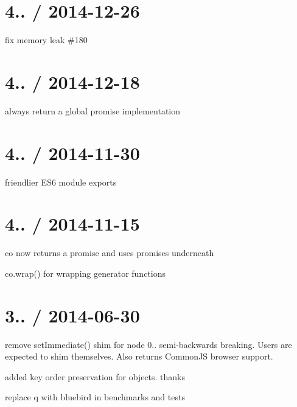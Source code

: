 \section*{4.. / 2014-\/12-\/26 }


\begin{DoxyItemize}
\item fix memory leak \#180
\end{DoxyItemize}

\section*{4.. / 2014-\/12-\/18 }


\begin{DoxyItemize}
\item always return a global promise implementation
\end{DoxyItemize}

\section*{4.. / 2014-\/11-\/30 }


\begin{DoxyItemize}
\item friendlier E\+S6 module exports
\end{DoxyItemize}

\section*{4.. / 2014-\/11-\/15 }


\begin{DoxyItemize}
\item co now returns a promise and uses promises underneath
\item {\ttfamily co.\+wrap()} for wrapping generator functions
\end{DoxyItemize}

\section*{3.. / 2014-\/06-\/30 }


\begin{DoxyItemize}
\item remove {\ttfamily set\+Immediate()} shim for node 0.. semi-\/backwards breaking. Users are expected to shim themselves. Also returns Common\+JS browser support.
\item added key order preservation for objects. thanks 
\item replace {\ttfamily q} with {\ttfamily bluebird} in benchmarks and tests
\end{DoxyItemize}


